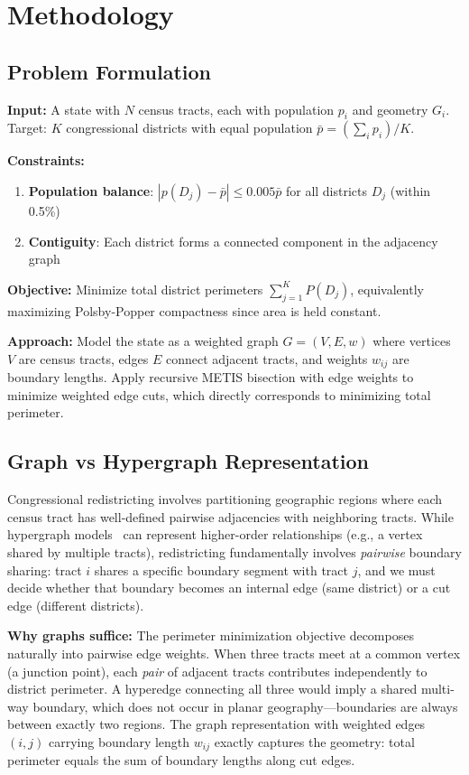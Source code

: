 \section{Methodology}

\subsection{Problem Formulation}

\textbf{Input:} A state with $N$ census tracts, each with population $p_i$ and geometry $G_i$. Target: $K$ congressional districts with equal population $\bar{p} = (\sum_i p_i) / K$.

\textbf{Constraints:}
\begin{enumerate}
    \item \textbf{Population balance}: $|p(D_j) - \bar{p}| \leq 0.005 \bar{p}$ for all districts $D_j$ (within 0.5\%)
    \item \textbf{Contiguity}: Each district forms a connected component in the adjacency graph
\end{enumerate}

\textbf{Objective:} Minimize total district perimeters $\sum_{j=1}^{K} P(D_j)$, equivalently maximizing Polsby-Popper compactness since area is held constant.

\textbf{Approach:} Model the state as a weighted graph $G = (V, E, w)$ where vertices $V$ are census tracts, edges $E$ connect adjacent tracts, and weights $w_{ij}$ are boundary lengths. Apply recursive METIS bisection with edge weights to minimize weighted edge cuts, which directly corresponds to minimizing total perimeter.

\subsection{Graph vs Hypergraph Representation}

Congressional redistricting involves partitioning geographic regions where each census tract has well-defined pairwise adjacencies with neighboring tracts. While hypergraph models~\cite{catalyurek1999hypergraph} can represent higher-order relationships (e.g., a vertex shared by multiple tracts), redistricting fundamentally involves \textit{pairwise} boundary sharing: tract $i$ shares a specific boundary segment with tract $j$, and we must decide whether that boundary becomes an internal edge (same district) or a cut edge (different districts).

\textbf{Why graphs suffice:} The perimeter minimization objective decomposes naturally into pairwise edge weights. When three tracts meet at a common vertex (a junction point), each \textit{pair} of adjacent tracts contributes independently to district perimeter. A hyperedge connecting all three would imply a shared multi-way boundary, which does not occur in planar geography—boundaries are always between exactly two regions. The graph representation with weighted edges $(i,j)$ carrying boundary length $w_{ij}$ exactly captures the geometry: total perimeter equals the sum of boundary lengths along cut edges.

